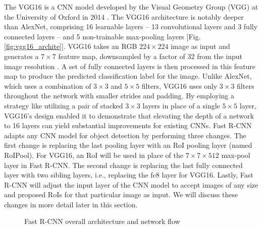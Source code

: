 The VGG16 is a CNN model developed by the Visual Geometry Group (VGG) at the University of Oxford in 2014 \cite{vgg16_2014}. The VGG16 architecture is notably deeper than AlexNet, comprising 16 learnable layers -- 13 convolutional layers and 3 fully connected layers -- and 5 non-trainable max-pooling layers [Fig. \ref{fig:vgg16_archite}]. VGG16 takes an RGB $224 \times 224$ image as input and generates a $7 \times 7$ feature map, downsampled by a factor of 32 from the input image resolution \cite{deconv_rcnn_2018}. A set of fully connected layers is then processed in this feature map to produce the predicted classification label for the image. Unlike AlexNet, which uses a combination of $3 \times 3$ and $5 \times 5$ filters, VGG16 uses only $3 \times 3$ filters throughout the network with smaller strides and padding. By employing a strategy like utilizing a pair of stacked $3 \times 3$ layers in place of a single $5 \times 5$ layer, VGG16's design enabled it to demonstrate that elevating the depth of a network to 16 layers can yield substantial improvements for existing CNNs. Fast R-CNN adapts any CNN model for object detection by performing three changes. The first change is replacing the last pooling layer with an RoI pooling layer (named RoIPool). For VGG16, an RoI will be used in place of the $7 \times 7 \times 512$ max-pool layer in Fast R-CNN. The second change is replacing the last fully connected layer with two sibling layers, i.e., replacing the fc8 layer for VGG16. Lastly, Fast R-CNN will adjust the input layer of the CNN model to accept images of any size and proposed RoIs for that particular image as input. We will discuss these changes in more detail later in this section.

\begin{figure}[!ht]
    \centering

    \caption{Fast R-CNN overall architecture and network flow} \label{fig:fast_rcnn_archite_flowc}
\end{figure}

